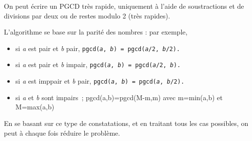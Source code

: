 \ifprof
\else
On peut écrire un PGCD très rapide, uniquement à l'aide de soustractions
et de divisions par deux ou de restes modulo 2 (très rapides).


L'algorithme se base sur la parité des nombres : par exemple,

\begin{itemize}
\item si \emph{a} est pair et \emph{b} pair, \texttt{pgcd(\emph{a}, \emph{b}) =
pgcd(\emph{a}/2, \emph{b}/2).}
\item si \emph{a} est pair et \emph{b} impair, \texttt{pgcd(\emph{a}, \emph{b}) =
pgcd(\emph{a}/2, \emph{b}).}
\item si \emph{a} est imppair et \emph{b} pair, \texttt{pgcd(\emph{a}, \emph{b}) =
pgcd(\emph{a}, \emph{b}/2).}
\item si \emph{a} et \emph{b} sont
impairs~; pgcd(a,b)=pgcd(M-m,m) avec m=min(a,b) et M=max(a,b)
\end{itemize}


En se basant sur ce type de constatations, et en traitant tous les cas
possibles, on peut à chaque fois réduire le problème.
\fi


